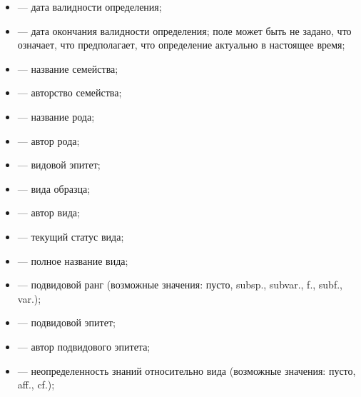 \documentclass[letterpaper,10pt,russian]{sphinxmanual}
\begin{document}
\begin{itemize}
\item {} 
 — дата валидности определения;

\item {} 
 — дата окончания валидности определения; поле может быть не задано, что означает, что предполагает, что определение актуально в настоящее время;

\item {} 
 — название семейства;

\item {} 
 — авторство семейства;

\item {} 
 — название рода;

\item {} 
 — автор рода;

\item {} 
 — видовой эпитет;

\item {} 
 —  вида образца;

\item {} 
 — автор вида;

\item {} 
 — текущий статус вида;

\item {} 
 — полное название вида;

\item {} 
 — подвидовой ранг (возможные значения: пусто, subsp., subvar., f., subf., var.);

\item {} 
 — подвидовой эпитет;

\item {} 
 — автор подвидового эпитета;

\item {} 
 — неопределенность знаний относительно вида (возможные значения: пусто, aff., cf.);

\end{itemize}
\end{document}
